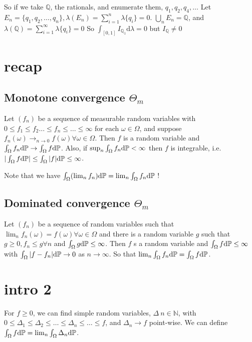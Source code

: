 So if we take $\mathbb{Q}$, the rationals, and enumerate them, $q_1,q_2,q_4,\dots$ Let $E_n=\{q_1,q_2,\dots,q_n\}, \lambda(E_n)=\sum_{i=1}^n\lambda\{q_i\}=0$. $\bigcup_n E_n=\mathbb{Q}$, and $\lambda(\mathbb{Q})=\sum_{i=1}^{\infty}\lambda\{ q_i \}=0$ So $\int_{[0,1]}I_{\mathbb{Q}_1}\text{d}\lambda=0$ but $I_{\mathbb{Q}}\neq 0$

\section{recap}

\subsection{Monotone convergence $\Theta_m$}

Let $(f_n)$ be a sequence of measurable random variables with $0\leq f_1\leq f_2\dots\leq f_n\leq\dots\leq\infty$ for each $\omega\in\Omega$, and suppose $f_n(\omega)\rightarrow_{n\rightarrow 0} f(\omega) \forall \omega\in\Omega$. Then $f$ is a random variable and $\int_{\Omega}f_n\text{d}\mathbb{P}\rightarrow\int_{\Omega}f\text{d}\mathbb{P}$. Also, if $\sup_n\int_\Omega f_n\text{d}\mathbb{P}<\infty$ then $f$ is integrable, i.e. $|\int_\Omega f \text{d}\mathbb{P}|\leq\int_\Omega |f| \text{d}\mathbb{P}\leq\infty$.

Note that we have $\int_\Omega (\lim_n f_n)\text{d}\mathbb{P}=\lim_n \int_\Omega f_n\text{d}\mathbb{P}$ !

\subsection{Dominated convergence $\Theta_m$}

Let $(f_n)$ be a sequence of random variables such that $\lim_n f_n(\omega)=f(\omega) \forall \omega \in\Omega$ and there is a random variable $g$ such that $g\geq 0, f_n\leq g \forall n$ and $\int_\Omega g \text{d}\mathbb{P}\leq\infty$. Then $f$ s a random variable and $\int_\Omega f \text{d}\mathbb{P}\leq\infty$ with $\int_\Omega |f-f_n|\text{d}\mathbb{P}\rightarrow 0$ as $n\rightarrow \infty$. So that $\lim_n\int_\Omega f_n \text{d}\mathbb{P}=\int_\Omega f \text{d}\mathbb{P}$.

\section{intro 2}

For $f\geq 0$, we can find simple random variables, $\Delta \: n\in\mathbb{N}$, with $0\leq\Delta_1\leq\Delta_2\leq\dots\leq\Delta_n\leq\dots\leq f$, and $\Delta_n\rightarrow f$ point-wise. We can define $\int_\Omega f \text{d}\mathbb{P}=\lim_n\int_\Omega\Delta_n\text{d}\mathbb{P}$.


